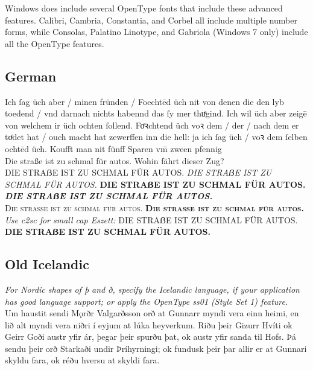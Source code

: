 Windows does include several OpenType fonts that include these advanced features.  Calibri, Cambria, Constantia, and Corbel all include multiple number forms, while Consolas, Palatino Linotype, and Gabriola (Windows 7 only) include all the OpenType features. 

{
\Large
{}
\lorem

\lorem

\lorem

\lorem
}

{
\large
{}

\lorem

\textit{\fox}
\textbf{\fox}
\textsc{\fox}
}



\subsection*{German}
\newcommand{\salt}[1]{{\addfontfeatures{Alternate=0}{#1}}}
\newcommand{\saltb}[1]{{\addfontfeatures{Alternate=1}{#1}}}
Ich ſag üch aber / minen fründen / Foechtēd üch nit von denen die den
lyb toedend / vnd darnach nichts habennd das ſy mer thuͤgind. Ich wil
üch aber zeigē von welchem ir üch \saltb{f}ochten ſollend. Foͤꝛchtend üch voꝛ
dem / der / nach dem er toͤdet hat / ouch macht hat zewerffen inn die
hell: ja ich ſag üch / voꝛ dem ſelben \saltb{f}ochtēd üch. Koufft man nit
fünff Sparen vm̄ zween pfennig\\[1ex]
{\Large Die straße ist zu schmal für autos. Wohin fährt dieser Zug?}\\
DIE STRAẞE IST ZU SCHMAL FÜR AUTOS.
{\itshape DIE STRAẞE IST ZU SCHMAL FÜR AUTOS.}
{\bfseries DIE STRAẞE IST ZU SCHMAL FÜR AUTOS.}
{\itshape\bfseries DIE STRAẞE IST ZU SCHMAL FÜR AUTOS.}\\[1ex]
{\scshape Die straße ist zu schmal für autos.
\bfseries Die straße ist zu schmal für autos.}
{\itshape Use c2sc for small cap Eszett:}
{DIE STRAẞE IST ZU SCHMAL FÜR AUTOS.
\bfseries DIE STRAẞE IST ZU SCHMAL FÜR AUTOS.}


\subsection*{Old Icelandic}
{\itshape For Nordic shapes of þ and ð, specify the Icelandic
language, if your application has good language support; or apply the OpenType
ss01 (Style Set 1) feature.}\\[1ex]
Um haustit sendi Mǫrðr Valgarðsson orð at Gunnarr myndi vera einn heimi, en
lið alt myndi vera niðri í eyjum at lúka heyverkum. Riðu þeir Gizurr Hvíti ok
Geirr Goði austr yfir ár, þegar þeir spurðu þat, ok austr yfir sanda til Hofs.
Þá sendu þeir orð Starkaði undir Þríhyrningi; ok fundusk þeir þar allir er at
Gunnari skyldu fara, ok réðu hversu at skyldi fara.



